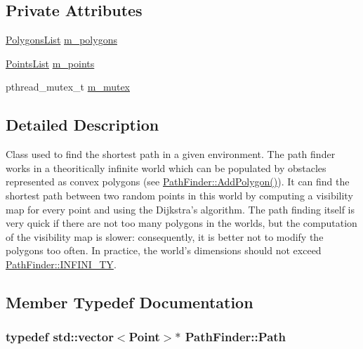 \subsection*{Private Attributes}
\begin{DoxyCompactItemize}
\item 
\hyperlink{classPathFinder_a16ed073fa542c82fd09e582cb4fbed24}{PolygonsList} \hyperlink{classPathFinder_a4cce0fd97519e8e9974c9f6a5f046f7f}{m\_\-polygons}
\item 
\hyperlink{classPathFinder_a792a34ce673309f873090141c3d96f1c}{PointsList} \hyperlink{classPathFinder_a90258ce800e2b170754c4779b66020ef}{m\_\-points}
\item 
pthread\_\-mutex\_\-t \hyperlink{classPathFinder_a4a70aef3998ffdbcbf20bb67a0f884e2}{m\_\-mutex}
\end{DoxyCompactItemize}


\subsection{Detailed Description}
Class used to find the shortest path in a given environment. The path finder works in a theoritically infinite world which can be populated by obstacles represented as convex polygons (see \hyperlink{classPathFinder_ae167f12c8466a501a5a54068f92328c7}{PathFinder::AddPolygon()}). It can find the shortest path between two random points in this world by computing a visibility map for every point and using the Dijkstra's algorithm. The path finding itself is very quick if there are not too many polygons in the worlds, but the computation of the visibility map is slower: consequently, it is better not to modify the polygons too often. In practice, the world's dimensions should not exceed \hyperlink{classPathFinder_a341ee3901465d58e8aad2fc0dd227168}{PathFinder::INFINI\_\-TY}. 

\subsection{Member Typedef Documentation}
\hypertarget{classPathFinder_a269aba09b7b3208092f67f2bc02cf63e}{
\subsubsection[{Path}]{\setlength{\rightskip}{0pt plus 5cm}typedef std::vector$<${\bf Point}$>$$\ast$ {\bf PathFinder::Path}}}
\label{classPathFinder_a269aba09b7b3208092f67f2bc02cf63e}


